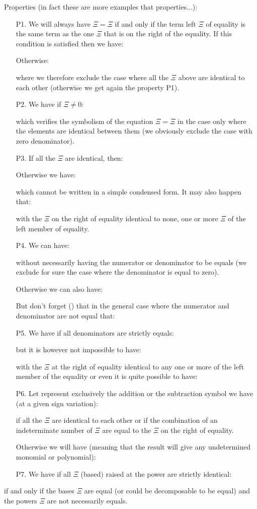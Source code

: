 	Properties (in fact these are more examples that properties...):
	\begin{enumerate}
		\item[P1.] We will always have $\Xi=\Xi$ if and only if the term left $\Xi$ of equality is the same term as the one $\Xi$  that is on the right of the equality. If this condition is satisfied then we have:
		
		Otherwise:
		
		where we therefore exclude the case where all the $\Xi$ above are identical to each other (otherwise we get again the property P1).
		\item[P2.] We have if $\Xi\neq 0$:
		
		which verifies the symbolism of the equation $\Xi=\Xi$ in the case only where the elements are identical between them (we obviously exclude the case with zero denominator).
	
		\item[P3.] 	If all the $\Xi$  are identical, then:
				
		Otherwise we have:
		
		which cannot be written in a simple condensed form. It may also happen that:
		
		with the $\Xi$ on the right of equality identical to none, one or more $\Xi$ of the left member of equality.

		\item[P4.] We can have:
		
		without necessarily having the numerator or denominator to be equals (we exclude for sure the case where the denominator is equal to zero).

		Otherwise we can also have:
		
		But don't forget () that in the general case where the numerator and denominator are not equal that:
		
		
		\item[P5.] We have if all denominators are strictly equals:
		
but it is however not impossible to have:
		
with the $\Xi$ at the right of equality identical to any one or more of the left member of the equality or even it is quite possible to have:
		

		\item[P6.] Let represent exclusively the addition or the subtraction symbol we have (at a given sign variation):
		
if all the $\Xi$ are identical to each other or if the combination of an indeterminate number of $\Xi$ are equal to the $\Xi$ on the right of equality.

		Otherwise we will have (meaning that the result will give any undetermined monomial or polynomial):
		

		\item[P7.] We have if all $\Xi$ (based) raised at the power are strictly identical:
		
	\end{enumerate}
	if and only if the bases $\Xi$ are equal (or could be decomposable to be equal) and the powers $\Xi$ are not  necessarily equals.

